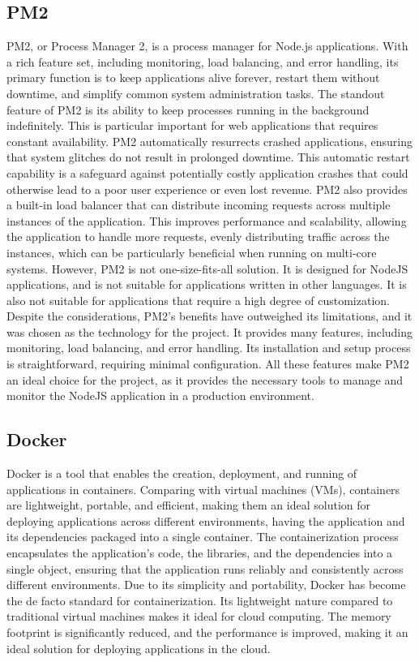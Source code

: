 \subsection{PM2}
PM2, or Process Manager 2, is a process manager for Node.js applications.
With a rich feature set, including monitoring, load balancing, and error handling, its primary function is to keep applications alive forever, restart them without downtime, and simplify common system administration tasks.
The standout feature of PM2 is its ability to keep processes running in the background indefinitely. This is particular important for web applications that requires constant availability. PM2 automatically resurrects crashed applications, ensuring that system glitches do not result in prolonged downtime.\cite{pm2}
This automatic restart capability is a safeguard against potentially costly application crashes that could otherwise lead to a poor user experience or even lost revenue. \cite{pm2}
PM2 also provides a built-in load balancer that can distribute incoming requests across multiple instances of the application. This improves performance and scalability, allowing the application to handle more requests, evenly distributing traffic across the instances, which can be particularly beneficial when running on multi-core systems. \cite{pm2LoadBalancing}
However, PM2 is not one-size-fits-all solution. It is designed for NodeJS applications, and is not suitable for applications written in other languages. It is also not suitable for applications that require a high degree of customization. \cite{pm2}
Despite the considerations, PM2's benefits have outweighed its limitations, and it was chosen as the technology for the project. It provides many features, including monitoring, load balancing, and error handling.
Its installation and setup process is straightforward, requiring minimal configuration. 
All these features make PM2 an ideal choice for the project, as it provides the necessary tools to manage and monitor the NodeJS application in a production environment.\cite{tilkov}

\subsection{Docker}

Docker is a tool that enables the creation, deployment, and running of applications in containers. 
Comparing with virtual machines (VMs), containers are lightweight, portable, and efficient, making them an ideal solution for deploying applications across different environments, 
having the application and its dependencies packaged into a single container. The containerization process encapsulates the application's code, the libraries, and the dependencies 
into a single object, ensuring that the application runs reliably and consistently across different environments. \cite{merkel2014docker}
Due to its simplicity and portability, Docker has become the de facto standard for containerization. Its lightweight nature compared to traditional virtual machines makes it ideal for cloud computing. 
The memory footprint is significantly reduced, and the performance is improved, making it an ideal solution for deploying applications in the cloud. \cite{merkel2014docker}

